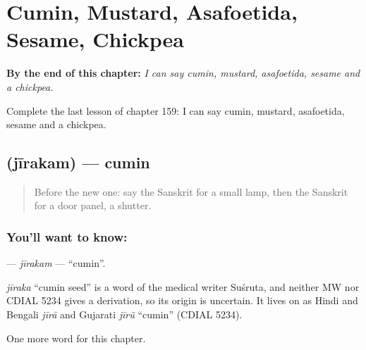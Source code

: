 
\chapter{Cumin, Mustard, Asafoetida, Sesame, Chickpea}
\label{ch:sa-cumin-mustard-asafoetida-sesame-chickpea}

\begin{chapteropening}
\textbf{By the end of this chapter:} \emph{I can say cumin, mustard, asafoetida, sesame and a chickpea.}

Complete the last lesson of chapter 159: I can say cumin, mustard, asafoetida, sesame and a chickpea.
\end{chapteropening}

\section[\texorpdfstring{\sk{जीरकम्} (jīrakam)}{जीरकम् (jīrakam)}]{ (jīrakam) — cumin}

\label{lesson:SA-C159-jirakam}



\begin{quote}
Before the new one: say the Sanskrit for a small lamp, then the Sanskrit for a door panel, a shutter.
\end{quote}

\subsection*{You'll want to know: }
\textbf{} — \emph{jīrakam} — \textquotedblleft{}cumin\textquotedblright{}.

\begin{cousinweb}
\emph{jīraka} \textquotedblleft{}cumin seed\textquotedblright{} is a word of the medical writer Suśruta, and neither MW nor CDIAL 5234 gives a derivation, so its origin is uncertain. It lives on as Hindi and Bengali \emph{jīrā} and Gujarati \emph{jīrũ} \textquotedblleft{}cumin\textquotedblright{} (CDIAL 5234).
\end{cousinweb}

\begin{grammarlens}[title={What you've built}]
One more word for this chapter.
\end{grammarlens}

